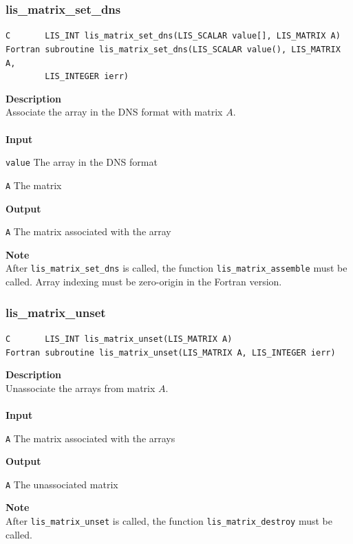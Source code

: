 \documentclass[a4paper]{article}
\newcommand{\namelistlabel}[1]{\mbox{#1}\hfill}
\newenvironment{namelist}[1]{%
\begin{list}{}
  {\let\makelabel\namelistlabel
  \settowidth{\labelwidth}{#1}
  \setlength{\leftmargin}{1.1\labelwidth}}
  }{%
\end{list}}
\begin{document}
\subsubsection{lis\_matrix\_set\_dns}
\begin{screen}
\verb|C       LIS_INT lis_matrix_set_dns(LIS_SCALAR value[], LIS_MATRIX A)|\\
\verb|Fortran subroutine lis_matrix_set_dns(LIS_SCALAR value(), LIS_MATRIX A,|\\
\verb|        LIS_INTEGER ierr)|
\end{screen}
{\bf Description}\\
\indent
Associate the array in the DNS format with matrix $A$.
\\ \\
\noindent
{\bf Input}
\begin{namelist}{XXXXXXXXXXXXXXXXXXXX}
\item[\tt value] The array in the DNS format
\item[\tt A] The matrix
\end{namelist}
{\bf Output}
\begin{namelist}{XXXXXXXXXXXXXXXXXXXX}
\item[\tt A] The matrix associated with the array
\end{namelist}
\noindent
{\bf Note}\\
\indent
After \verb|lis_matrix_set_dns| is called, 
the function \verb|lis_matrix_assemble| must be called. 
Array indexing must be zero-origin in the Fortran version.

\subsubsection{lis\_matrix\_unset}
\begin{screen}
\verb|C       LIS_INT lis_matrix_unset(LIS_MATRIX A)|\\
\verb|Fortran subroutine lis_matrix_unset(LIS_MATRIX A, LIS_INTEGER ierr)|
\end{screen}
{\bf Description}\\
\indent
Unassociate the arrays from matrix $A$.
\\ \\
\noindent
{\bf Input}
\begin{namelist}{XXXXXXXXXXXXXXXXXXXX}
\item[\tt A] The matrix associated with the arrays
\end{namelist}
{\bf Output}
\begin{namelist}{XXXXXXXXXXXXXXXXXXXX}
\item[\tt A] The unassociated matrix
\end{namelist}
\noindent
{\bf Note}\\
\indent
After \verb|lis_matrix_unset| is called, 
the function \verb|lis_matrix_destroy| must be called. 
\end{document}
